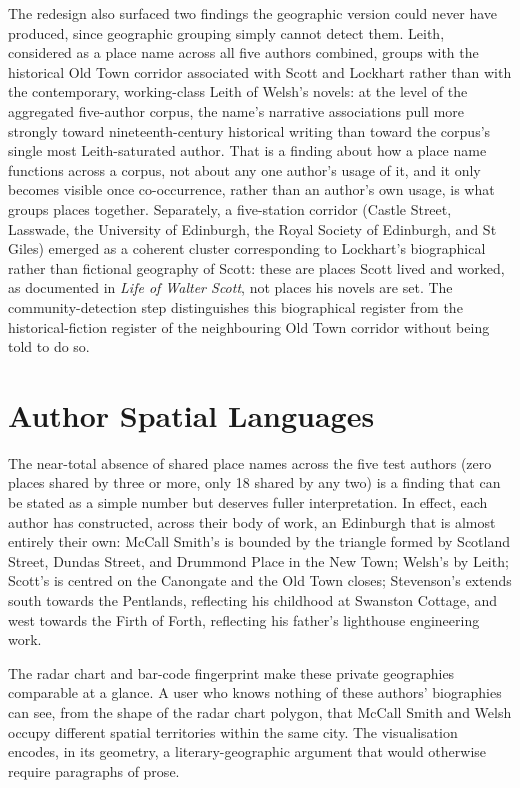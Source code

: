 \documentclass[logo,msc]{infthesis}
\begin{document}
The redesign also surfaced two findings the geographic version could never have produced, since geographic grouping simply cannot detect them. Leith, considered as a place name across all five authors combined, groups with the historical Old Town corridor associated with Scott and Lockhart rather than with the contemporary, working-class Leith of Welsh's novels: at the level of the aggregated five-author corpus, the name's narrative associations pull more strongly toward nineteenth-century historical writing than toward the corpus's single most Leith-saturated author. That is a finding about how a place name functions across a corpus, not about any one author's usage of it, and it only becomes visible once co-occurrence, rather than an author's own usage, is what groups places together. Separately, a five-station corridor (Castle Street, Lasswade, the University of Edinburgh, the Royal Society of Edinburgh, and St Giles) emerged as a coherent cluster corresponding to Lockhart's biographical rather than fictional geography of Scott: these are places Scott lived and worked, as documented in \textit{Life of Walter Scott}, not places his novels are set. The community-detection step distinguishes this biographical register from the historical-fiction register of the neighbouring Old Town corridor without being told to do so.

\section{Author Spatial Languages}
 
The near-total absence of shared place names across the five test authors (zero places shared by three or more, only 18 shared by any two) is a finding that can be stated as a simple number but deserves fuller interpretation. In effect, each author has constructed, across their body of work, an Edinburgh that is almost entirely their own: McCall Smith's is bounded by the triangle formed by Scotland Street, Dundas Street, and Drummond Place in the New Town; Welsh's by Leith; Scott's is centred on the Canongate and the Old Town closes; Stevenson's extends south towards the Pentlands, reflecting his childhood at Swanston Cottage, and west towards the Firth of Forth, reflecting his father's lighthouse engineering work.
 
The radar chart and bar-code fingerprint make these private geographies comparable at a glance. A user who knows nothing of these authors' biographies can see, from the shape of the radar chart polygon, that McCall Smith and Welsh occupy different spatial territories within the same city. The visualisation encodes, in its geometry, a literary-geographic argument that would otherwise require paragraphs of prose.
\end{document}
